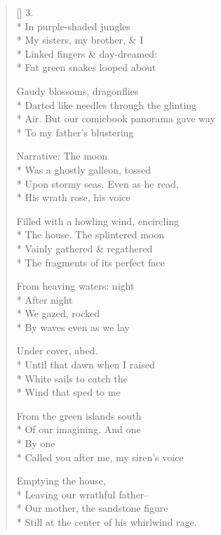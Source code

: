 \begin{verse}[\versewidth]
3.\\*
In purple-shaded jungles\\*
My sisters, my brother, \& I\\*
Linked fingers \& day-dreamed:\\*
Fat green snakes looped about

Gaudy blossoms, dragonflies\\*
Darted like needles through the glinting\\*
Air. But our comicbook panorama gave way\\*
To my father's blustering

Narrative: The moon\\*
Was a ghostly galleon, tossed\\*
Upon stormy seas. Even as he read,\\*
His wrath rose, his voice

Filled with a howling wind, encircling\\*
The house. The splintered moon\\*
Vainly gathered \& regathered\\*
The fragments of its perfect face

From heaving waters: night\\*
After night\\*
We gazed, rocked\\*
By waves even as we lay

Under cover, abed.\\*
Until that dawn when I raised\\*
White sails to catch the \\*
Wind that sped to me

From the green islands south\\*
Of our imagining. And one\\*
By one\\*
Called you after me, my siren's voice

Emptying the house,\\*
Leaving our wrathful father--\\*
Our mother, the sandstone figure\\*
Still at the center of his whirlwind rage.
\end{verse}
